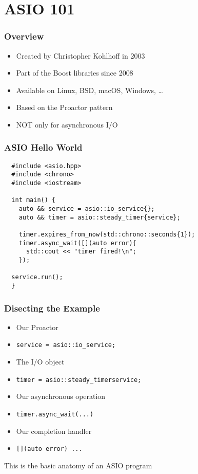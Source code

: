 \section{ASIO 101}

\begin{frame}
  \frametitle{Overview}
  \begin{itemize}
    \item{Created by Christopher Kohlhoff in 2003}\pause{}
    \item{Part of the Boost libraries since 2008}\pause{}
    \item{Available on Linux, BSD, macOS, Windows, \ldots{}}\pause{}
    \item{Based on the Proactor pattern}\pause{}
    \item{NOT only for asynchronous I/O}
  \end{itemize}
\end{frame}

\begin{frame}[fragile]
  \frametitle{ASIO Hello World}
  \begin{verbatim}
  #include <asio.hpp>
  #include <chrono>
  #include <iostream>

  int main() {
    auto && service = asio::io_service{};
    auto && timer = asio::steady_timer{service};

    timer.expires_from_now(std::chrono::seconds{1});
    timer.async_wait([](auto error){
      std::cout << "timer fired!\n";
    });

  service.run();
  }
  \end{verbatim}
\end{frame}

\begin{frame}[fragile]
  \frametitle{Disecting the Example}
  \begin{itemize}
    \item{Our Proactor}
    \item{\texttt{service = asio::io_service{};}}\pause{}
    \item{The I/O object}
    \item{\texttt{timer = asio::steady_timer{service};}}\pause{}
    \item{Our asynchronous operation}
    \item{\texttt{timer.async_wait(...)}}\pause{}
    \item{Our completion handler}
    \item{\texttt{[](auto error){ ... }}}
  \end{itemize}
\end{frame}

\begin{frame}[fragile]
  \begin{centering}
    \Large{This is the basic anatomy of an ASIO program}
  \end{centering}
\end{frame}
